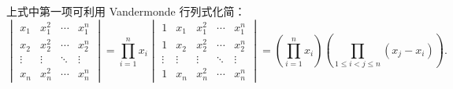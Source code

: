 \documentclass[UTF8,12pt,a4paper,fontset=fandol]{ctexart}
\begin{document}
\begin{solve}
            上式中第一项可利用 Vandermonde 行列式化简：
            \[
                \begin{vmatrix}
                    x_1    & x_1^2  & \cdots & x_1^n  \\
                    x_2    & x_2^2  & \cdots & x_2^n  \\
                    \vdots & \vdots & \ddots & \vdots \\
                    x_n    & x_n^2  & \cdots & x_n^n
                \end{vmatrix} = \prod_{i=1}^n x_i \begin{vmatrix}
                    1      & x_1    & x_1^2  & \cdots & x_1^n  \\
                    1      & x_2    & x_2^2  & \cdots & x_2^n  \\
                    \vdots & \vdots & \vdots & \ddots & \vdots \\
                    1      & x_n    & x_n^2  & \cdots & x_n^n
                \end{vmatrix} = \left(\prod_{i=1}^n x_i\right) \left(\prod_{1 \leqslant i < j \leqslant n} (x_j - x_i)\right).
            \]


\end{solve}
\end{document}
